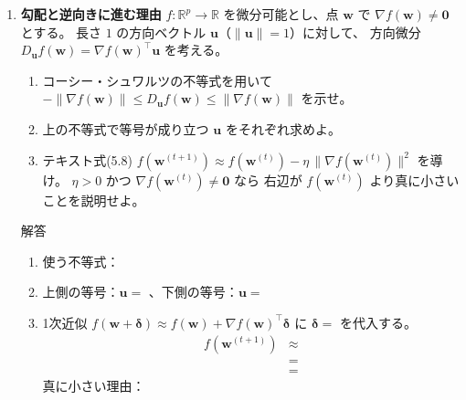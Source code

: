 \documentclass[a4paper,dvipdfmx]{jsarticle}
\newcommand{\提出期限}{2026年10月26日（月）}
\newcommand{\学籍番号}{0000000}
\newcommand{\氏名}{氏名を書く}
\newcommand{\提出日}{2026年10月26日}
\newenvironment{answer}{\begin{itembox}[l]{解答}}{\end{itembox}}
\begin{document}
\begin{enumerate}
\begin{answer}
\begin{enumerate}
          長軸の向き：\phantom{XXXX}。理由：
          \vspace{10mm}
      \end{enumerate}
    \end{answer}

  \item \textbf{勾配と逆向きに進む理由}\quad
    $f : \mathbb{R}^p \to \mathbb{R}$ を微分可能とし、点 $\bm{w}$ で $\nabla f(\bm{w}) \neq \bm{0}$ とする。
    長さ $1$ の方向ベクトル $\bm{u}$（$\|\bm{u}\| = 1$）に対して、
    方向微分 $D_{\bm{u}} f(\bm{w}) = \nabla f(\bm{w})^\top \bm{u}$ を考える。
    \begin{enumerate}
      \item コーシー・シュワルツの不等式を用いて $-\|\nabla f(\bm{w})\| \leq D_{\bm{u}} f(\bm{w}) \leq \|\nabla f(\bm{w})\|$ を示せ。
      \item 上の不等式で等号が成り立つ $\bm{u}$ をそれぞれ求めよ。
      \item テキスト式(5.8) $f(\bm{w}^{(t+1)}) \approx f(\bm{w}^{(t)}) - \eta\,\|\nabla f(\bm{w}^{(t)})\|^2$ を導け。
        $\eta > 0$ かつ $\nabla f(\bm{w}^{(t)}) \neq \bm{0}$ なら
        右辺が $f(\bm{w}^{(t)})$ より真に小さいことを説明せよ。
    \end{enumerate}
    \begin{answer}
      \begin{enumerate}
        \item 使う不等式：\phantom{XXXXXXXXXXXX}
          \vspace{14mm}
        \item 上側の等号：$\bm{u} = $ \phantom{XXXXXX}、下側の等号：$\bm{u} = $ \phantom{XXXXXX}
          \vspace{4mm}
        \item 1次近似 $f(\bm{w} + \bm{\delta}) \approx f(\bm{w}) + \nabla f(\bm{w})^\top\bm{\delta}$ に $\bm{\delta} = $ \phantom{XXXXXX} を代入する。
          \begin{align*}
            f(\bm{w}^{(t+1)}) &\approx \\
                              &= \\
                              &=
          \end{align*}
          真に小さい理由：
          \vspace{10mm}
      \end{enumerate}
    \end{answer}


\end{enumerate}
\end{document}
